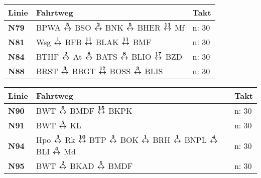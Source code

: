 \begin{minipage}[t]{0.05\textwidth}
\phantom{Tor}
\end{minipage}
\begin{minipage}[t]{0.45\textwidth}
\begin{tabular}{>{\bfseries}L{1.2cm}L{9.0cm}L{3.0cm}}
{\bfseries Linie} & {\bfseries Fahrtweg} & {\bfseries Takt} \\
\hline
\nbus{} N79   & BPWA $\boldsymbol{\overset{5}{\leftrightarrow}}$ BSO $\boldsymbol{\overset{2}{\leftrightarrow}}$ BNK $\boldsymbol{\overset{5}{\leftrightarrow}}$ BHER $\boldsymbol{\overset{11}{\leftrightarrow}}$ Mf                                                                                               & n: 30                      \\
\nbus{} N81   & Wsg $\boldsymbol{\overset{1}{\leftrightarrow}}$ BFB $\boldsymbol{\overset{11}{\leftrightarrow}}$ BLAK $\boldsymbol{\overset{11}{\leftrightarrow}}$ BMF                                                                                                              & n: 30                      \\
\nbus{} N84   & BTHF $\boldsymbol{\overset{2}{\leftrightarrow}}$ At $\boldsymbol{\overset{8}{\leftrightarrow}}$ BATS $\boldsymbol{\overset{8}{\leftrightarrow}}$ BLIO $\boldsymbol{\overset{17}{\leftrightarrow}}$ BZD                                                                                              & n: 30                      \\
\nbus{} N88   & BRST $\boldsymbol{\overset{3}{\leftrightarrow}}$ BBGT $\boldsymbol{\overset{17}{\leftrightarrow}}$ BOSS $\boldsymbol{\overset{3}{\leftrightarrow}}$ BLIS                                                                                                            & n: 30                      \\
\hline
\end{tabular}
\end{minipage}
\begin{minipage}[t]{0.45\textwidth}
\begin{tabular}{>{\bfseries}L{1.2cm}L{9.0cm}L{3.0cm}}
{\bfseries Linie} & {\bfseries Fahrtweg} & {\bfseries Takt} \\
\hline
\nbus{} N90   & BWT $\boldsymbol{\overset{6}{\leftrightarrow}}$ BMDF $\boldsymbol{\overset{15}{\leftrightarrow}}$ BKPK                                                                                                                              & n: 30                      \\
\nbus{} N91   & BWT $\boldsymbol{\overset{5}{\leftrightarrow}}$ KL                                                                                                                                                  & n: 30                      \\
\nbus{} N94   & Hpo $\boldsymbol{\overset{3}{\leftrightarrow}}$ Rk $\boldsymbol{\overset{10}{\leftrightarrow}}$ BTP $\boldsymbol{\overset{3}{\leftrightarrow}}$ BOK $\boldsymbol{\overset{1}{\leftrightarrow}}$ BRH $\boldsymbol{\overset{1}{\leftrightarrow}}$ BNPL $\boldsymbol{\overset{4}{\leftrightarrow}}$ BLI $\boldsymbol{\overset{4}{\leftrightarrow}}$ Md                                                 & n: 30                      \\
\nbus{} N95   & BWT $\boldsymbol{\overset{2}{\leftrightarrow}}$ BKAD $\boldsymbol{\overset{5}{\leftrightarrow}}$ BMDF                                                                                                                               & n: 30                      \\
\hline
\end{tabular}
\end{minipage}
